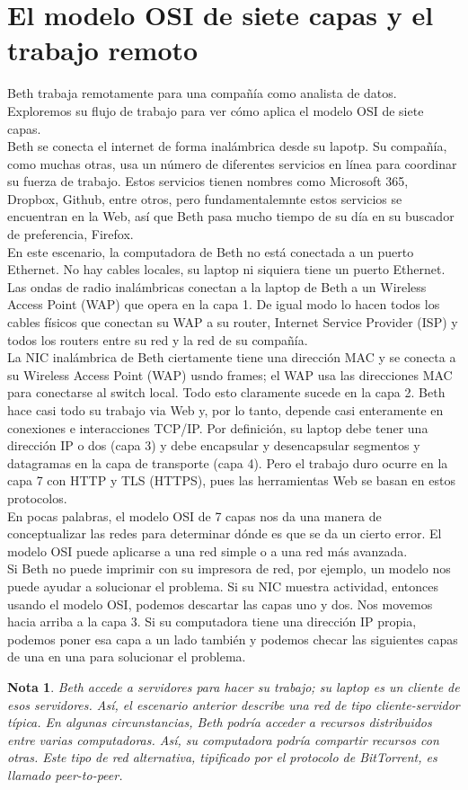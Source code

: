 \documentclass[12pt]{report}
\newtheorem{nota}{Nota}
\begin{document}
\section{El modelo OSI de siete capas y el trabajo remoto}
Beth trabaja remotamente para una compañía como analista de datos.
Exploremos su flujo de trabajo para ver cómo aplica el modelo OSI de siete capas.\\
Beth se conecta el internet de forma inalámbrica desde su lapotp.
Su compañía, como muchas otras, usa un número de diferentes servicios 
en línea para coordinar su fuerza de trabajo. Estos servicios tienen
nombres como Microsoft 365, Dropbox, Github, entre otros, pero fundamentalemnte
estos servicios se encuentran en la Web, así que Beth pasa mucho tiempo de su día en su 
buscador de preferencia, Firefox.\\
En este escenario, la computadora de Beth no está conectada a un puerto Ethernet.
No hay cables locales, su laptop ni siquiera tiene un puerto Ethernet.\\
Las ondas de radio inalámbricas conectan a la laptop de Beth a un Wireless Access Point (WAP)
que opera en la capa 1. De igual modo lo hacen todos los cables físicos que conectan su 
WAP a su router, Internet Service Provider (ISP) y todos los routers entre su red y la 
red de su compañía.\\
La NIC inalámbrica de Beth ciertamente tiene una dirección MAC y se conecta a su Wireless 
Access Point (WAP) usndo frames; el WAP usa las direcciones MAC para conectarse al switch local.
Todo esto claramente sucede en la capa 2. Beth hace casi todo su trabajo
via Web y, por lo tanto, depende casi enteramente en conexiones e interacciones 
TCP/IP. Por definición, su laptop debe tener una dirección IP o dos (capa 3) y 
debe encapsular y desencapsular segmentos y datagramas en la capa de transporte (capa 4).
Pero el trabajo duro ocurre en la capa 7 con HTTP y  TLS (HTTPS), pues las herramientas Web
se basan en estos protocolos.\\
En pocas palabras, el modelo OSI de 7 capas nos da una manera de conceptualizar 
las redes para determinar dónde es que se da un cierto error. 
El modelo OSI puede aplicarse a una red simple o a una red más avanzada.\\
Si Beth no puede imprimir con su impresora de red, por ejemplo, un modelo
nos puede ayudar a solucionar el problema. Si su NIC muestra actividad, entonces
usando el modelo OSI, podemos descartar las capas uno y dos. Nos movemos
hacia arriba a la capa 3. Si su computadora tiene una dirección IP propia, podemos poner
esa capa a un lado también y podemos checar las siguientes capas de una en una para 
solucionar el problema.
\begin{nota}
  Beth accede a servidores para hacer su trabajo; su laptop es un cliente
  de esos servidores. Así, el escenario anterior describe una red de tipo cliente-servidor típica.
  En algunas circunstancias, Beth podría acceder a recursos distribuidos entre 
  varias computadoras. Así, su computadora podría compartir recursos con otras.
  Este tipo de red alternativa, tipificado por el protocolo de BitTorrent, 
  es llamado peer-to-peer.
\end{nota}
\end{document}
